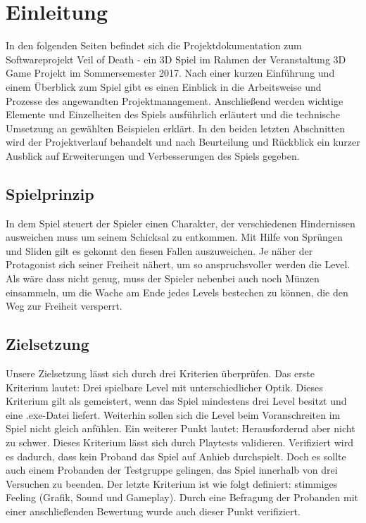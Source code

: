 \documentclass[10pt]{article}
\begin{document}

%

\newpage

\tableofcontents

\newpage
	
\section{Einleitung}
In den folgenden Seiten befindet sich die Projektdokumentation zum Softwareprojekt \glqq Veil of Death\grqq{} - ein 3D Spiel im Rahmen der Veranstaltung 3D Game Projekt im Sommersemester 2017. \newline
Nach einer kurzen Einführung und einem Überblick zum Spiel gibt es einen Einblick in die Arbeitsweise und Prozesse des angewandten Projektmanagement.
Anschließend werden wichtige Elemente und Einzelheiten des Spiels ausführlich erläutert und die technische Umsetzung an gewählten Beispielen erklärt.
In den beiden letzten Abschnitten wird der Projektverlauf behandelt und nach Beurteilung und Rückblick ein kurzer Ausblick auf Erweiterungen und Verbesserungen des Spiels gegeben.

\vspace{0.5cm}
\subsection{Spielprinzip}

In dem Spiel steuert der Spieler einen Charakter, der verschiedenen Hindernissen ausweichen muss um seinem Schicksal zu entkommen. Mit Hilfe von
Sprüngen und Sliden gilt es gekonnt den fiesen Fallen auszuweichen. Je näher der Protagonist sich seiner Freiheit nähert, um so anspruchsvoller werden die Level.
Als wäre dass nicht genug, muss der Spieler nebenbei auch noch Münzen einsammeln, um die Wache am Ende jedes Levels bestechen zu können, die den Weg zur Freiheit versperrt.

\vspace{0.5cm}
\subsection{Zielsetzung}

Unsere Zielsetzung lässt sich durch drei Kriterien überprüfen.\newline
Das erste Kriterium lautet: \glqq Drei spielbare Level mit unterschiedlicher Optik\grqq. Dieses
Kriterium gilt als gemeistert, wenn das Spiel mindestens drei Level besitzt und eine .exe-Datei liefert. Weiterhin sollen sich die Level beim Voranschreiten im
Spiel nicht gleich anfühlen.\newline
Ein weiterer Punkt lautet: \glqq Herausfordernd aber nicht zu schwer\grqq. Dieses Kriterium lässt sich durch Playtests validieren. Verifiziert wird es dadurch, dass
kein Proband das Spiel auf Anhieb durchspielt. Doch es sollte auch einem Probanden der Testgruppe gelingen, das Spiel innerhalb von drei Versuchen zu beenden.\newline
Der letzte Kriterium ist wie folgt definiert: \glqq stimmiges Feeling (Grafik, Sound und Gameplay)\grqq. Durch eine Befragung der Probanden mit einer anschließenden
Bewertung wurde auch dieser Punkt verifiziert.
\end{document}
